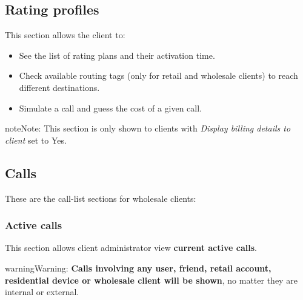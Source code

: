 \documentclass[letterpaper,10pt,english]{sphinxmanual}
\begin{document}
\subsection{Rating profiles}
\label{administration_portal/client/wholesale/rating_profiles:rating-profiles}\label{administration_portal/client/wholesale/rating_profiles::doc}
This section allows the client to:
\begin{itemize}
\item {} 
See the list of rating plans and their activation time.

\item {} 
Check available routing tags (only for retail and wholesale clients) to reach different destinations.

\item {} 
Simulate a call and guess the cost of a given call.

\end{itemize}

\begin{notice}{note}{Note:}
This section is only shown to clients with \emph{Display billing details to client} set to Yes.
\end{notice}


\subsection{Calls}
\label{administration_portal/client/wholesale/calls/index::doc}\label{administration_portal/client/wholesale/calls/index:calls}
These are the call-list sections for wholesale clients:


\subsubsection{Active calls}
\label{administration_portal/client/wholesale/calls/active_calls::doc}\label{administration_portal/client/wholesale/calls/active_calls:active-calls}
This section allows client administrator view \textbf{current active calls}.

\begin{notice}{warning}{Warning:}
\textbf{Calls involving any user, friend, retail account, residential device or wholesale client will be shown},
no matter they are internal or external.
\end{notice}
\end{document}
